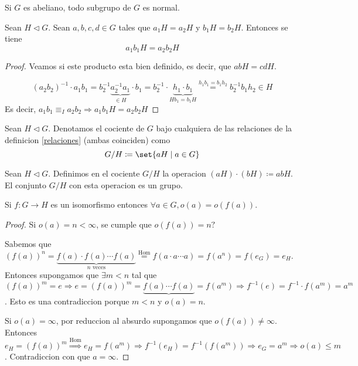 \begin{definition}
	Si \(G \) es abeliano, todo subgrupo de \(G \) es normal.
\end{definition}
\begin{proposition}
	Sean \(H \vartriangleleft G \). Sean \(a,b,c,d \in G \) tales que \(a_1H = a_2 H \) y \(b_1H = b_2H \). Entonces se tiene
	\[
		a_1b_1 H = a_{2}b_2H
	\]
\end{proposition}
\begin{proof}
	Veamos si este producto esta bien definido, es decir, que \(abH = cdH \).
	
	\[
		(a_2 b_2)^{-1} \cdot a_1 b_1 = b^{-1}_2 \underbrace{a^{-1}_2 a_1}_{\in H } \cdot b_1 = b^{-1}_2 \cdot \underbrace{h_1 \cdot b_1 }_{Hb_1 = b_1 H} \overset{h_1 b_1 = b_1 h_2}{=} b^{-1}_2 b_1 h_2 \in H
	\]
	Es decir, \(a_1 b_1 \equiv_I a_2 b_2 \Rightarrow a_1 b_1 H = a_2 b_2 H \)
\end{proof}
\begin{definition}
	Sean \(H \vartriangleleft G \). Denotamos el cociente de \(G \) bajo cualquiera de las relaciones de la definicion \ref{relaciones} (ambas coinciden) como
	\[
		G/H \coloneqq \set{aH \mid a \in G }
	\]
	
\end{definition}
\begin{proposition}
	Sean \(H \vartriangleleft G\). Definimos en el cociente \(G / H \) la operacion \((aH) \cdot (bH ) \coloneqq abH \). El conjunto \(G / H \) con esta operacion es un grupo.
\end{proposition}

\begin{lemma}
	Si \(f \colon G \to H \) es un isomorfismo entonces \(\forall a \in G, o(a) = o(f(a ))\).
\end{lemma}
\begin{proof}
	Si \(o(a) = n < \infty \), se cumple que \(o(f(a)) = n ? \)
	
	Sabemos que \((f(a))^{n} = \underbrace{f(a) \cdot f(a) \cdots f(a)}_{n \text{ veces} } \overset{\text{Hom} } = f(a \cdot a \cdots a) = f(a^{n} ) = f(e_G) = e_H\). Entonces supongamos que \(\exists m < n \) tal que \((f(a))^{m} = e \Rightarrow e = (f(a))^{m} = \underbrace{f(a) \cdots f(a)} = f(a^{m}) \Rightarrow f^{-1} (e) = f^{-1} \cdot f (a^{m} ) = a^{m}   \). Esto es una contradiccion porque \(m < n \) y \(o(a) = n \).
	
	Si \(o(a) = \infty \), por reduccion al absurdo supongamos que \(o(f(a)) \neq \infty \). Entonces \(e_H = (f(a))^{m} \overset{\text{Hom} }{\Rightarrow} e_H = f(a^{m} ) \Rightarrow  f^{-1} (e_H) = f^{-1} (f(a^{m} )) \Rightarrow e_G = a^{m} \Rightarrow o(a) \leq m \). Contradiccion con que \(a = \infty \).
\end{proof}

